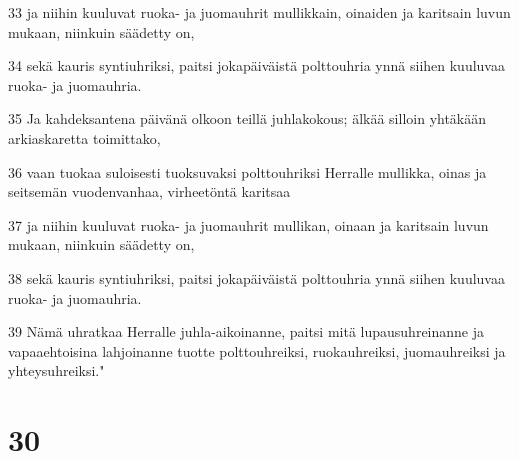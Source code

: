 \par 33 ja niihin kuuluvat ruoka- ja juomauhrit mullikkain, oinaiden ja karitsain luvun mukaan, niinkuin säädetty on,
\par 34 sekä kauris syntiuhriksi, paitsi jokapäiväistä polttouhria ynnä siihen kuuluvaa ruoka- ja juomauhria.
\par 35 Ja kahdeksantena päivänä olkoon teillä juhlakokous; älkää silloin yhtäkään arkiaskaretta toimittako,
\par 36 vaan tuokaa suloisesti tuoksuvaksi polttouhriksi Herralle mullikka, oinas ja seitsemän vuodenvanhaa, virheetöntä karitsaa
\par 37 ja niihin kuuluvat ruoka- ja juomauhrit mullikan, oinaan ja karitsain luvun mukaan, niinkuin säädetty on,
\par 38 sekä kauris syntiuhriksi, paitsi jokapäiväistä polttouhria ynnä siihen kuuluvaa ruoka- ja juomauhria.
\par 39 Nämä uhratkaa Herralle juhla-aikoinanne, paitsi mitä lupausuhreinanne ja vapaaehtoisina lahjoinanne tuotte polttouhreiksi, ruokauhreiksi, juomauhreiksi ja yhteysuhreiksi."

\chapter{30}

